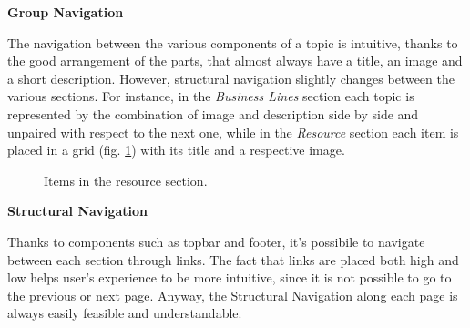 \textbf{Group Navigation}\par
The navigation between the various components of a topic is intuitive, thanks to the good arrangement of the parts, that almost always have a title, an image and a short description. However, structural navigation slightly changes between the various sections. For instance, in the \textit{Business Lines} section each topic is represented by the combination of image and description side by side and unpaired with respect to the next one, while in the \textit{Resource} section each item is placed in a grid (fig. \ref{grid}) with its title and a respective image.
\medskip

\begin{figure}[H]

  \centering
    \caption{Items in the resource section.}
    \label{grid}

    
\end{figure}


\textbf{Structural Navigation}\par
Thanks to components such as topbar and footer, it's possibile to navigate between each section through links. The fact that links are placed both high and low helps user’s experience to be more intuitive, since it is not possible to go to the previous or next page. Anyway, the Structural Navigation along each page is always easily feasible and understandable.
\medskip


\begin{figure}[H]
  \centering
\end{figure}




